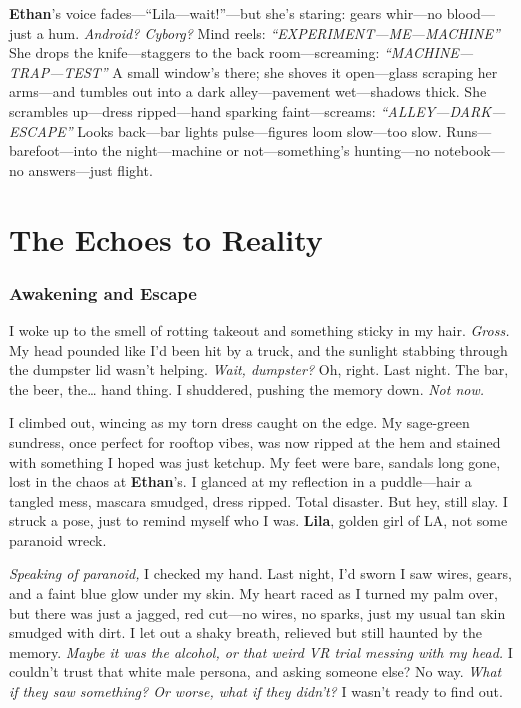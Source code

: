 \documentclass{article}
\begin{document}
\textbf{Ethan}’s voice fades—“Lila—wait!”—but she’s staring: gears whir—no blood—just a hum. \textit{Android? Cyborg?} Mind reels: \textit{“EXPERIMENT—ME—MACHINE”} She drops the knife—staggers to the back room—screaming: \textit{“MACHINE—TRAP—TEST”} A small window’s there; she shoves it open—glass scraping her arms—and tumbles out into a dark alley—pavement wet—shadows thick. She scrambles up—dress ripped—hand sparking faint—screams: \textit{“ALLEY—DARK—ESCAPE”} Looks back—bar lights pulse—figures loom slow—too slow. Runs—barefoot—into the night—machine or not—something’s hunting—no notebook—no answers—just flight.

\part {The Echoes to Reality}

\section*{Awakening and Escape}

I woke up to the smell of rotting takeout and something sticky in my hair. \textit{Gross.} My head pounded like I’d been hit by a truck, and the sunlight stabbing through the dumpster lid wasn’t helping. \textit{Wait, dumpster?} Oh, right. Last night. The bar, the beer, the… hand thing. I shuddered, pushing the memory down. \textit{Not now.}

I climbed out, wincing as my torn dress caught on the edge. My sage-green sundress, once perfect for rooftop vibes, was now ripped at the hem and stained with something I hoped was just ketchup. My feet were bare, sandals long gone, lost in the chaos at \textbf{Ethan}’s. I glanced at my reflection in a puddle—hair a tangled mess, mascara smudged, dress ripped. Total disaster. But hey, still slay. I struck a pose, just to remind myself who I was. \textbf{Lila}, golden girl of LA, not some paranoid wreck.

\textit{Speaking of paranoid,} I checked my hand. Last night, I’d sworn I saw wires, gears, and a faint blue glow under my skin. My heart raced as I turned my palm over, but there was just a jagged, red cut—no wires, no sparks, just my usual tan skin smudged with dirt. I let out a shaky breath, relieved but still haunted by the memory. \textit{Maybe it was the alcohol, or that weird VR trial messing with my head.} I couldn’t trust that white male persona, and asking someone else? No way. \textit{What if they saw something? Or worse, what if they didn’t?} I wasn’t ready to find out.
\end{document}
